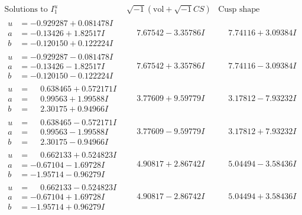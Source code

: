\documentclass[1p]{elsarticle_modified}
\theoremstyle{definition}
\newcommand{\I}{\sqrt{-1}}
\begin{document}
$$\begin{array}{c|c|c}  
\text{Solutions to }I^u_{1}& \I (\text{vol} + \sqrt{-1}CS) & \text{Cusp shape}\\
 \hline 
\begin{aligned}
u &= -0.929287 + 0.081478 I \\
a &= -0.13426 + 1.82517 I \\
b &= -0.120150 + 0.122224 I\end{aligned}
 & \phantom{-}7.67542 - 3.35786 I & \phantom{-}7.74116 + 3.09384 I \\ \hline\begin{aligned}
u &= -0.929287 - 0.081478 I \\
a &= -0.13426 - 1.82517 I \\
b &= -0.120150 - 0.122224 I\end{aligned}
 & \phantom{-}7.67542 + 3.35786 I & \phantom{-}7.74116 - 3.09384 I \\ \hline\begin{aligned}
u &= \phantom{-}0.638465 + 0.572171 I \\
a &= \phantom{-}0.99563 + 1.99588 I \\
b &= \phantom{-}2.30175 + 0.94966 I\end{aligned}
 & \phantom{-}3.77609 + 9.59779 I & \phantom{-}3.17812 - 7.93232 I \\ \hline\begin{aligned}
u &= \phantom{-}0.638465 - 0.572171 I \\
a &= \phantom{-}0.99563 - 1.99588 I \\
b &= \phantom{-}2.30175 - 0.94966 I\end{aligned}
 & \phantom{-}3.77609 - 9.59779 I & \phantom{-}3.17812 + 7.93232 I \\ \hline\begin{aligned}
u &= \phantom{-}0.662133 + 0.524823 I \\
a &= -0.67104 - 1.69728 I \\
b &= -1.95714 - 0.96279 I\end{aligned}
 & \phantom{-}4.90817 + 2.86742 I & \phantom{-}5.04494 - 3.58436 I \\ \hline\begin{aligned}
u &= \phantom{-}0.662133 - 0.524823 I \\
a &= -0.67104 + 1.69728 I \\
b &= -1.95714 + 0.96279 I\end{aligned}
 & \phantom{-}4.90817 - 2.86742 I & \phantom{-}5.04494 + 3.58436 I \\ \hline\begin{aligned}

\end{aligned}
\end{array}$$
\end{document}
